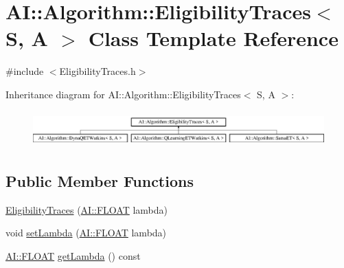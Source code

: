 \hypertarget{classAI_1_1Algorithm_1_1EligibilityTraces}{\section{A\-I\-:\-:Algorithm\-:\-:Eligibility\-Traces$<$ S, A $>$ Class Template Reference}
\label{classAI_1_1Algorithm_1_1EligibilityTraces}
}


{\ttfamily \#include $<$Eligibility\-Traces.\-h$>$}

Inheritance diagram for A\-I\-:\-:Algorithm\-:\-:Eligibility\-Traces$<$ S, A $>$\-:\begin{figure}[H]
\begin{center}
\leavevmode
\includegraphics[height=1.408805cm]{classAI_1_1Algorithm_1_1EligibilityTraces}
\end{center}
\end{figure}
\subsection*{Public Member Functions}
\begin{DoxyCompactItemize}
\item 
\hyperlink{classAI_1_1Algorithm_1_1EligibilityTraces_a5ee88e5ac3059733c38a95dba54f677d}{Eligibility\-Traces} (\hyperlink{namespaceAI_a41b74884a20833db653dded3918e05c3}{A\-I\-::\-F\-L\-O\-A\-T} lambda)
\item 
void \hyperlink{classAI_1_1Algorithm_1_1EligibilityTraces_ac52edaa0eeaf4446edb14f7b5415819f}{set\-Lambda} (\hyperlink{namespaceAI_a41b74884a20833db653dded3918e05c3}{A\-I\-::\-F\-L\-O\-A\-T} lambda)
\item 
\hyperlink{namespaceAI_a41b74884a20833db653dded3918e05c3}{A\-I\-::\-F\-L\-O\-A\-T} \hyperlink{classAI_1_1Algorithm_1_1EligibilityTraces_aea9a2c36874a3df328efdf4077ea1c19}{get\-Lambda} () const 
\end{DoxyCompactItemize}
